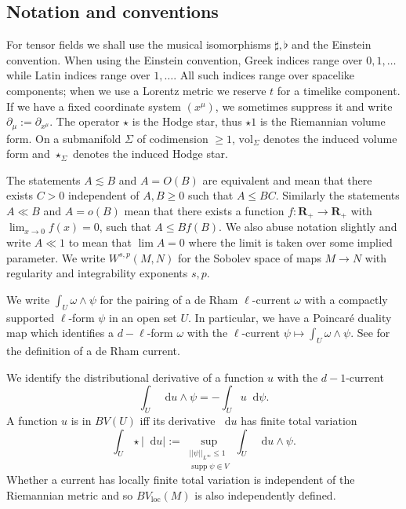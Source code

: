 \documentclass[reqno,10pt]{amsart}
\newcommand{\RR}{\mathbf{R}}
\DeclareMathOperator{\supp}{supp}
\newcommand*\dif{\mathop{}\!\mathrm{d}}
\newcommand{\vol}{\mathrm{vol}}
\newcommand{\loc}{\mathrm{loc}}
\theoremstyle{definition}
\numberwithin{equation}{section}
\begin{document}
\subsection{Notation and conventions}
For tensor fields we shall use the musical isomorphisms $\sharp, \flat$ and the Einstein convention.
When using the Einstein convention, Greek indices range over $0, 1, \dots$ while Latin indices range over $1, \dots$.
All such indices range over spacelike components; when we use a Lorentz metric we reserve $t$ for a timelike component.
If we have a fixed coordinate system $(x^\mu)$, we sometimes suppress it and write $\partial_\mu := \partial_{x^\mu}$.
The operator $\star$ is the Hodge star, thus $\star 1$ is the Riemannian volume form.
On a submanifold $\Sigma$ of codimension $\geq 1$, $\vol_\Sigma$ denotes the induced volume form and $\star_\Sigma$ denotes the induced Hodge star.

The statements $A \lesssim B$ and $A = O(B)$ are equivalent and mean that there exists $C > 0$ independent of $A, B \geq 0$ such that $A \leq BC$.
Similarly the statements $A \ll B$ and $A = o(B)$ mean that there exists a function $f: \RR_+ \to \RR_+$ with $\lim_{x \to 0} f(x) = 0$, such that $A \leq Bf(B)$.
We also abuse notation slightly and write $A \ll 1$ to mean that $\lim A = 0$ where the limit is taken over some implied parameter.
We write $W^{s, p}(M, N)$ for the Sobolev space of maps $M \to N$ with regularity and integrability exponents $s, p$.

We write $\int_U \omega \wedge \psi$ for the pairing of a de Rham $\ell$-current $\omega$ with a compactly supported $\ell$-form $\psi$ in an open set $U$.
In particular, we have a Poincar\'e duality map which identifies a $d - \ell$-form $\omega$ with the $\ell$-current $\psi \mapsto \int_U \omega \wedge \psi$.
See \cite{simon1983GMT} for the definition of a de Rham current.

We identify the distributional derivative of a function $u$ with the $d-1$-current
$$\int_U \dif u \wedge \psi = -\int_U u \dif \psi.$$
A function $u$ is in $BV(U)$ iff its derivative $\dif u$ has finite total variation
\begin{equation}\label{total variation}
\int_U \star |\dif u| := \sup_{\substack{||\psi||_{L^\infty} \leq 1\\\supp \psi \Subset V}} \int_U \dif u \wedge \psi.
\end{equation}
Whether a current has locally finite total variation is independent of the Riemannian metric and so $BV_\loc(M)$ is also independently defined.
\end{document}
